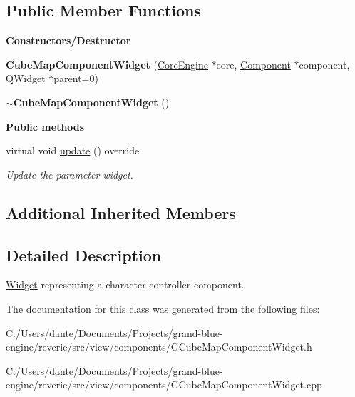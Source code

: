 \subsection*{Public Member Functions}
\begin{Indent}\textbf{ Constructors/\+Destructor}\par
\begin{DoxyCompactItemize}
\item 
\mbox{\label{classrev_1_1_view_1_1_cube_map_component_widget_a50d325c7088d2a415211d4baeb2d42a1}} 
{\bfseries Cube\+Map\+Component\+Widget} (\mbox{\hyperlink{classrev_1_1_core_engine}{Core\+Engine}} $\ast$core, \mbox{\hyperlink{classrev_1_1_component}{Component}} $\ast$component, Q\+Widget $\ast$parent=0)
\item 
\mbox{\label{classrev_1_1_view_1_1_cube_map_component_widget_a4c501f6f1178d03763e0f27c424d2725}} 
{\bfseries $\sim$\+Cube\+Map\+Component\+Widget} ()
\end{DoxyCompactItemize}
\end{Indent}
\begin{Indent}\textbf{ Public methods}\par
\begin{DoxyCompactItemize}
\item 
\mbox{\label{classrev_1_1_view_1_1_cube_map_component_widget_a93feecb47848a3a4f390633225c9067e}} 
virtual void \mbox{\hyperlink{classrev_1_1_view_1_1_cube_map_component_widget_a93feecb47848a3a4f390633225c9067e}{update}} () override
\begin{DoxyCompactList}\small\item\em Update the parameter widget. \end{DoxyCompactList}\end{DoxyCompactItemize}
\end{Indent}
\subsection*{Additional Inherited Members}


\subsection{Detailed Description}
\mbox{\hyperlink{class_widget}{Widget}} representing a character controller component. 

The documentation for this class was generated from the following files\+:\begin{DoxyCompactItemize}
\item 
C\+:/\+Users/dante/\+Documents/\+Projects/grand-\/blue-\/engine/reverie/src/view/components/G\+Cube\+Map\+Component\+Widget.\+h\item 
C\+:/\+Users/dante/\+Documents/\+Projects/grand-\/blue-\/engine/reverie/src/view/components/G\+Cube\+Map\+Component\+Widget.\+cpp\end{DoxyCompactItemize}
